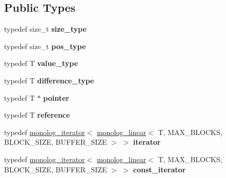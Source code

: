 \subsection*{Public Types}
\begin{DoxyCompactItemize}
\item 
\mbox{\label{classdialog_1_1monolog_1_1monolog__linear_a4c35060b9db227ae41d53adfbbf98754}} 
typedef size\+\_\+t {\bfseries size\+\_\+type}
\item 
\mbox{\label{classdialog_1_1monolog_1_1monolog__linear_a600bbf1ecd2906db568b9601ff0800ba}} 
typedef size\+\_\+t {\bfseries pos\+\_\+type}
\item 
\mbox{\label{classdialog_1_1monolog_1_1monolog__linear_ab86d46ab870789b1940451d6a6fa198b}} 
typedef T {\bfseries value\+\_\+type}
\item 
\mbox{\label{classdialog_1_1monolog_1_1monolog__linear_aaffd9ed6b9cd8097fe4f60e8259a7445}} 
typedef T {\bfseries difference\+\_\+type}
\item 
\mbox{\label{classdialog_1_1monolog_1_1monolog__linear_a874cdbb0087e094c8b705a30d8b1e1f6}} 
typedef T $\ast$ {\bfseries pointer}
\item 
\mbox{\label{classdialog_1_1monolog_1_1monolog__linear_afe41d924217028d48cb7403b192cc59a}} 
typedef T {\bfseries reference}
\item 
\mbox{\label{classdialog_1_1monolog_1_1monolog__linear_ac7f07437eb9d7766c6d440c2bf885d2d}} 
typedef \hyperlink{classdialog_1_1monolog_1_1monolog__iterator}{monolog\+\_\+iterator}$<$ \hyperlink{classdialog_1_1monolog_1_1monolog__linear}{monolog\+\_\+linear}$<$ T, M\+A\+X\+\_\+\+B\+L\+O\+C\+KS, B\+L\+O\+C\+K\+\_\+\+S\+I\+ZE, B\+U\+F\+F\+E\+R\+\_\+\+S\+I\+ZE $>$ $>$ {\bfseries iterator}
\item 
\mbox{\label{classdialog_1_1monolog_1_1monolog__linear_ad8d50968cecff583da2055963fe82d6c}} 
typedef \hyperlink{classdialog_1_1monolog_1_1monolog__iterator}{monolog\+\_\+iterator}$<$ \hyperlink{classdialog_1_1monolog_1_1monolog__linear}{monolog\+\_\+linear}$<$ T, M\+A\+X\+\_\+\+B\+L\+O\+C\+KS, B\+L\+O\+C\+K\+\_\+\+S\+I\+ZE, B\+U\+F\+F\+E\+R\+\_\+\+S\+I\+ZE $>$ $>$ {\bfseries const\+\_\+iterator}
\end{DoxyCompactItemize}
